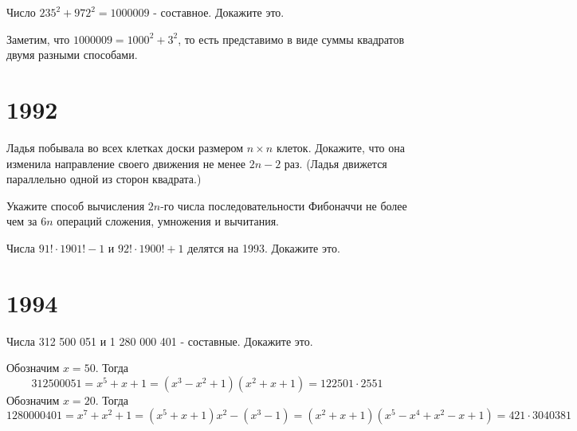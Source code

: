 \documentclass[11pt, a4paper]{common/document_template}
\begin{document}
\begin{exercise}[1288]
Число $235^{2} + 972^{2} = 1000009$ - составное. Докажите это.
\end{exercise}

\begin{Solution}
Заметим, что $1000009 = 1000^{2} + 3^{2}$, то есть представимо в виде суммы квадратов двумя разными способами.
\end{Solution}

\chapter{1992}

\begin{exercise}[1321]
Ладья побывала во всех клетках доски размером $n \times n$ клеток. Докажите, что она изменила направление своего движения не менее $2n-2$ раз. (Ладья движется параллельно одной из сторон квадрата.)
\end{exercise}

\begin{exercise}[1338]
Укажите способ вычисления $2n$-го числа последовательности Фибоначчи не более чем за $6n$ операций сложения, умножения и вычитания.
\end{exercise}

\begin{exercise}[1357]
Числа $91! \cdot 1901! - 1$ и $92! \cdot 1900! + 1$ делятся на 1993. Докажите это.
\end{exercise}

\begin{Solution}

\end{Solution}

\chapter{1994}

\begin{exercise}[1422]
Числа 312 500 051 и 1 280 000 401 - составные. Докажите это.
\end{exercise}

\begin{Solution}
Обозначим $x = 50$. Тогда
$$
312 500 051 = x^{5} + x + 1 = (x^{3} - x^{2} + 1)(x^{2} + x + 1) = 122501 \cdot 2551
$$
Обозначим $x = 20$. Тогда
$$
1 280 000 401 = x^{7} + x^{2} + 1 = (x^{5} + x + 1)x^{2} - (x^{3} - 1) = (x^{2} + x + 1)(x^{5} - x^{4} + x^{2} - x + 1) = 421 \cdot 3040381
$$
\end{Solution}
\end{document}

